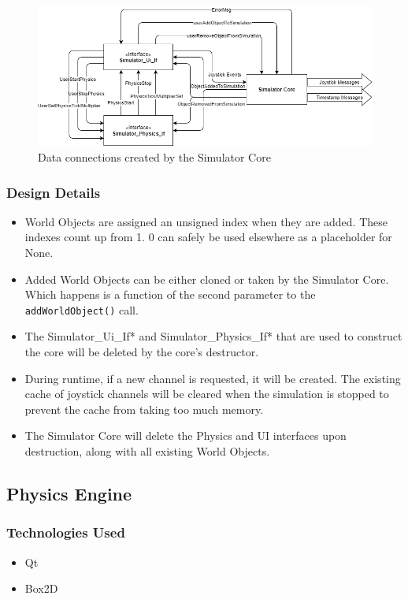  \begin{figure}[h]
 	\begin{center}
 	\includegraphics[scale=0.5]{./images_design/uml/DataFlow_simcore}
 	\caption{Data connections created by the Simulator Core\label{uml:dataflow_simcore}}
 	\end{center}
 \end{figure} 

\subsubsection*{Design Details}
\begin{itemize}
	\item World Objects are assigned an unsigned index when they are added. These indexes count up from 1. 0 can safely be used elsewhere as a placeholder for None.
	\item Added World Objects can be either cloned or taken by the Simulator Core. Which happens is a function of the second parameter to the \lstinline|addWorldObject()| call.
	\item The Simulator\_Ui\_If* and Simulator\_Physics\_If* that are used to construct the core will be deleted by the core's destructor.
	\item During runtime, if a new channel is requested, it will be created. The existing cache of joystick channels will be cleared when the simulation is stopped to prevent the cache from
	taking too much memory.
	\item The Simulator Core will delete the Physics and UI interfaces upon destruction, along with all existing World Objects.
\end{itemize}

\subsection{Physics Engine}

\subsubsection*{Technologies  Used}
\begin{itemize}
	\item Qt
	\item Box2D
\end{itemize}

